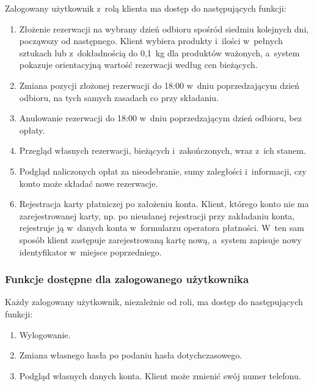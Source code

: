 \documentclass[12pt,a4paper,oneside]{article}
\newcounter{pu}
\begin{document}
Zalogowany użytkownik z~rolą klienta ma dostęp do następujących funkcji:

\begin{enumerate}[resume*=wf]
	\item \label{wf:rez-zlozenie} Złożenie rezerwacji na wybrany dzień odbioru spośród siedmiu kolejnych dni, począwszy od następnego. Klient wybiera produkty i~ilości w~pełnych sztukach lub z~dokładnością do 0,1~kg dla produktów ważonych, a~system pokazuje orientacyjną wartość rezerwacji według cen bieżących.
	\item \label{wf:rez-zmiana} Zmiana pozycji złożonej rezerwacji do 18:00 w~dniu poprzedzającym dzień odbioru, na tych samych zasadach co przy składaniu.
	\item \label{wf:rez-anulowanie} Anulowanie rezerwacji do 18:00 w~dniu poprzedzającym dzień odbioru, bez opłaty.
	\item \label{wf:rez-przeglad} Przegląd własnych rezerwacji, bieżących i~zakończonych, wraz z~ich stanem.
	\item \label{wf:zaleglosc} Podgląd naliczonych opłat za nieodebranie, sumy zaległości i~informacji, czy konto może składać nowe rezerwacje.
	\item \label{wf:karta-ponowna} Rejestracja karty płatniczej po założeniu konta. Klient, którego konto nie ma zarejestrowanej karty, np. po nieudanej rejestracji przy zakładaniu konta, rejestruje ją w~danych konta w~formularzu operatora płatności. W~ten sam sposób klient zastępuje zarejestrowaną kartę nową, a~system zapisuje nowy identyfikator w~miejsce poprzedniego.
\end{enumerate}

\subsubsection{Funkcje dostępne dla zalogowanego użytkownika}

Każdy zalogowany użytkownik, niezależnie od roli, ma dostęp do następujących funkcji:

\begin{enumerate}[resume*=wf]
	\item \label{wf:wylogowanie} Wylogowanie.
	\item \label{wf:zmiana-hasla} Zmiana własnego hasła po podaniu hasła dotychczasowego.
	\item \label{wf:dane-konta} Podgląd własnych danych konta. Klient może zmienić swój numer telefonu.
\end{enumerate}
\end{document}
